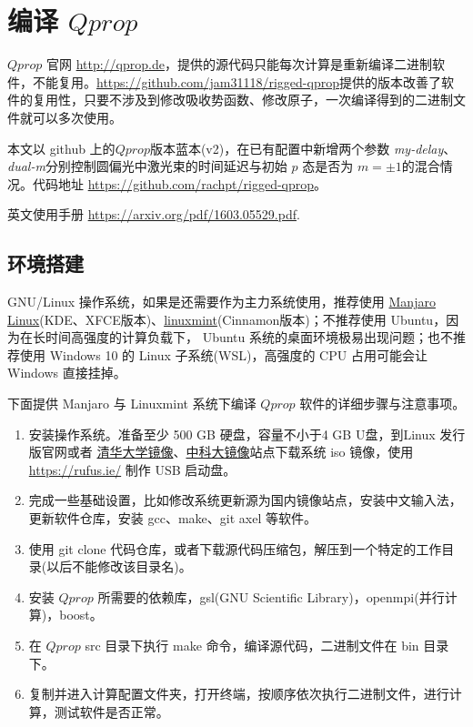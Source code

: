 \section{编译 $Qprop$}

$Qprop$ 官网 \url{http://qprop.de}，提供的源代码只能每次计算是重新编译二进制软件，不能复用。\url{https://github.com/jam31118/rigged-qprop}提供的版本改善了软件的复用性，只要不涉及到修改吸收势函数、修改原子，一次编译得到的二进制文件就可以多次使用。

本文以 github 上的$Qprop$版本蓝本(v2)，在已有配置中新增两个参数 \textit{my-delay}、\textit{dual-m}分别控制圆偏光中激光束的时间延迟与初始 $p$ 态是否为 $m= \pm 1$的混合情况。代码地址 \url{https://github.com/rachpt/rigged-qprop}。

英文使用手册 \url{https://arxiv.org/pdf/1603.05529.pdf}.

\subsection{环境搭建}
GNU/Linux 操作系统，如果是还需要作为主力系统使用，推荐使用 \href{https://manjaro.org/download/}{Manjaro Linux}(KDE、XFCE版本)、\href{https://linuxmint.com/download.php}{linuxmint}(Cinnamon版本)；不推荐使用 Ubuntu，因为在长时间高强度的计算负载下， Ubuntu 系统的桌面环境极易出现问题；也不推荐使用 Windows 10 的 Linux 子系统(WSL)，高强度的 CPU 占用可能会让 Windows 直接挂掉。


下面提供 Manjaro 与 Linuxmint 系统下编译 $Qprop$ 软件的详细步骤与注意事项。

\begin{enumerate}
    \item 安装操作系统。准备至少 500 GB 硬盘，容量不小于4 GB U盘，到Linux 发行版官网或者 \href{https://mirrors.tuna.tsinghua.edu.cn/}{清华大学镜像}、\href{https://mirrors.ustc.edu.cn/}{中科大镜像}站点下载系统 iso 镜像，使用 \url{https://rufus.ie/} 制作 USB 启动盘。
    \item 完成一些基础设置，比如修改系统更新源为国内镜像站点，安装中文输入法，更新软件仓库，安装 gcc、make、git axel 等软件。
    \item 使用 git clone 代码仓库，或者下载源代码压缩包，解压到一个特定的工作目录(以后不能修改该目录名)。
    \item 安装 $Qprop$ 所需要的依赖库，gsl(GNU Scientific Library)，openmpi(并行计算)，boost。
    \item 在 $Qprop$ src 目录下执行 make 命令，编译源代码，二进制文件在 bin 目录下。
    \item 复制并进入计算配置文件夹，打开终端，按顺序依次执行二进制文件，进行计算，测试软件是否正常。
\end{enumerate}

